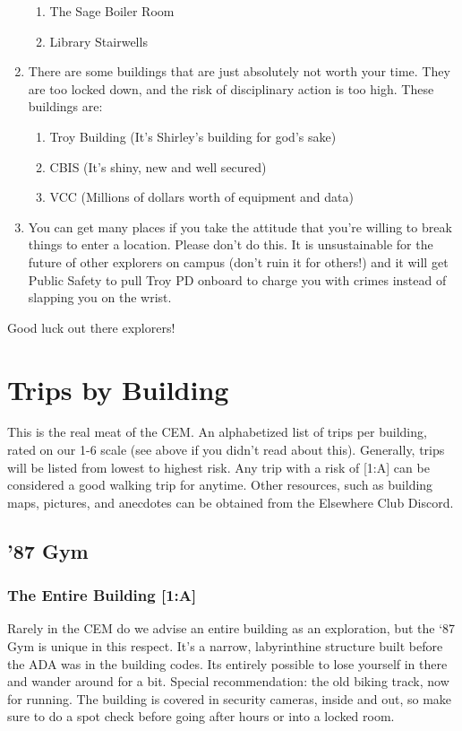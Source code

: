 \documentclass{article}
\begin{document}
\begin{enumerate}
\begin{enumerate}
    \item The Sage Boiler Room
    \item Library Stairwells
  \end{enumerate}
\item There are some buildings that are just absolutely not worth your time. They are too locked down, and the risk of disciplinary action is too high. These buildings are:
  \begin{enumerate}
    \item Troy Building (It’s Shirley’s building for god’s sake)
    \item CBIS (It’s shiny, new and well secured)
    \item VCC (Millions of dollars worth of equipment and data)
  \end{enumerate}
\item You can get many places if you take the attitude that you’re willing to break things to enter a location. Please don’t do this. It is unsustainable for the future of other explorers on campus (don’t ruin it for others!) and it will get Public Safety to pull Troy PD onboard to charge you with crimes instead of slapping you on the wrist.
\end{enumerate}
Good luck out there explorers!

\section{Trips by Building}
This is the real meat of the CEM. An alphabetized list of trips per building, rated on our 1-6 scale (see above if you didn’t read about this). Generally, trips will be listed from lowest to highest risk. Any trip with a risk of [1:A] can be considered a good walking trip for anytime. Other resources, such as building maps, pictures, and anecdotes can be obtained from the Elsewhere Club Discord.



\pagebreak
\subsection{'87 Gym}
\subsubsection{The Entire Building [1:A]}
Rarely in the CEM do we advise an entire building as an exploration, but the ‘87 Gym is unique in this respect. It’s a narrow, labyrinthine structure built before the ADA was in the building codes. Its entirely possible to lose yourself in there and wander around for a bit. Special recommendation: the old biking track, now for running. The building is covered in security cameras, inside and out, so make sure to do a spot check before going after hours or into a locked room.
\end{document}
